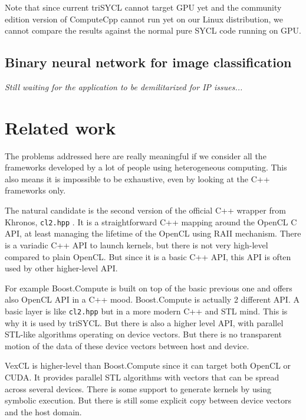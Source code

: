 \documentclass[sigplan, review]{acmart}
\begin{document}
Note that since current triSYCL \cite{triSYCL} cannot target GPU yet
and the community edition version of ComputeCpp \cite{ComputeCpp}
cannot run yet on our Linux distribution, we cannot compare the
results against the normal pure SYCL code running on GPU.

\subsection{Binary neural network for image classification}
\label{sec:example-from-ken}

\emph{Still waiting for the application to be demilitarized for IP issues...}


\section{Related work}
\label{sec:related-work}

The problems addressed here are really meaningful if we consider all
the frameworks developed by a lot of people using heterogeneous
computing. This also means it is impossible to be exhaustive, even by
looking at the C++ frameworks only.

The natural candidate is the second version of the official C++
wrapper from Khronos, \texttt{cl2.hpp} \cite{cl2.hpp}. It is a
straightforward C++ mapping around the OpenCL C API, at least managing
the lifetime of the OpenCL using RAII mechanism. There is a variadic
C++ API to launch kernels, but there is not very high-level compared
to plain OpenCL. But since it is a basic C++ API, this API is often
used by other higher-level API.

For example Boost.Compute \cite{Boost.Compute} is built on top of the
basic previous one and offers also OpenCL API in a C++ mood.
Boost.Compute is actually 2 different API. A basic layer is like
\texttt{cl2.hpp} but in a more modern C++ and STL mind. This is why it
is used by triSYCL. But there is also a higher level API, with
parallel STL-like algorithms operating on device vectors. But there is
no transparent motion of the data of these device vectors between host
and device.

VexCL \cite{VexCL} is higher-level than Boost.Compute since it can
target both OpenCL or CUDA. It provides parallel STL algorithms with
vectors that can be spread across several devices. There is some
support to generate kernels by using symbolic execution. But there is
still some explicit copy between device vectors and the host domain.
\end{document}
